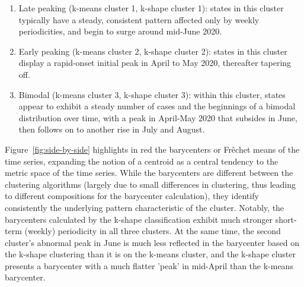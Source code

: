 \documentclass{article}
\begin{document}
\begin{enumerate}
	\item Late peaking (k-means cluster 1, k-shape cluster 1): states in this cluster typically have a steady, consistent pattern affected only by weekly periodicities, and begin to surge around mid-June 2020.
	\item Early peaking (k-means cluster 2, k-shape cluster 2): states in this cluster display a rapid-onset initial peak in April to May 2020, thereafter tapering off. 
	\item Bimodal (k-means cluster 3, k-shape cluster 3): within this cluster, states appear to exhibit a steady number of cases and the beginnings of a bimodal distribution over time, with a peak in April-May 2020 that subsides in June, then follows on to another rise in July and August.
\end{enumerate}

Figure~\ref{fig:side-by-side} highlights in red the barycenters or Fr\^{e}chet means of the time series, expanding the notion of a centroid as a central tendency to the metric space of the time series. While the barycenters are different between the clustering algorithms (largely due to small differences in clustering, thus leading to different compositions for the barycenter calculation), they identify consistently the underlying pattern characteristic of the cluster. Notably, the barycenters calculated by the k-shape classification exhibit much stronger short-term (weekly) periodicity in all three clusters. At the same time, the second cluster's abnormal peak in June is much less reflected in the barycenter based on the k-shape clustering than it is on the k-means cluster, and the k-shape cluster presents a barycenter with a much flatter 'peak' in mid-April than the k-means barycenter.
\end{document}
